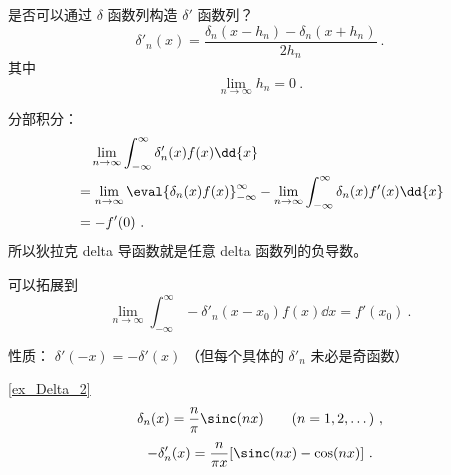 
\begin{issues}
\issueDraft
\end{issues}


是否可以通过 $\delta$ 函数列构造 $\delta'$ 函数列？
\begin{equation}
\delta'_n(x) = \frac{\delta_n(x-h_n) - \delta_n(x+h_n)}{2h_n}~.
\end{equation}
其中
\begin{equation}
\lim_{n\to\infty} h_n = 0~.
\end{equation}

分部积分：
\begin{equation}
\begin{aligned}
&\quad \lim_{n\to\infty}\int_{-\infty}^\infty \delta'_n(x) f(x) \dd{x}\\
&= \lim_{n\to\infty}\eval{\delta_n(x) f(x)}_{-\infty}^\infty - \lim_{n\to\infty}\int_{-\infty}^\infty \delta_n(x) f'(x) \dd{x}\\
&= - f'(0)~.
\end{aligned}
\end{equation}
所以狄拉克 delta 导函数就是任意 delta 函数列的负导数。

可以拓展到
\begin{equation}
\lim_{n\to\infty}\int_{-\infty}^\infty -\delta'_n(x-x_0) f(x) \dd{x} = f'(x_0)~.
\end{equation}

性质： $\delta'(-x) = -\delta'(x)$ （但每个具体的 $\delta'_n$ 未必是奇函数）

\begin{example}{}
\autoref{ex_Delta_2}~
\begin{equation}
\delta_n(x) = \frac{n}{\pi}\sinc(n x) \qquad (n = 1, 2, \dots)~,
\end{equation}
\begin{equation}
-\delta'_n(x) = \frac{n}{\pi x} [\sinc(nx) - \cos(nx)]~.
\end{equation}
\end{example}
